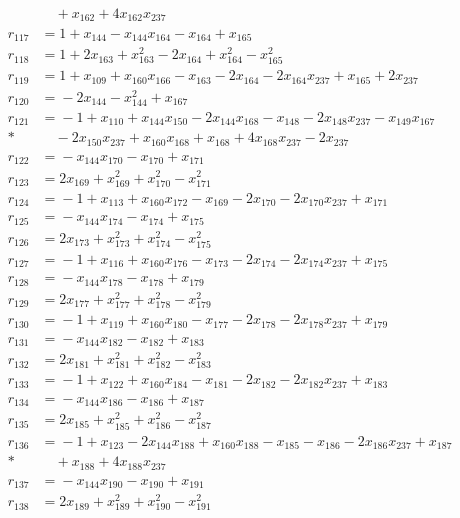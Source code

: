 \documentclass[11pt]{article}
\theoremstyle{remark}\newtheorem{remark}[theorem]{Remark}
\begin{document}
\begin{align*}
&\quad{}+x_{162}+4x_{162}x_{237}\\[2pt]
r_{117}&={}1+x_{144}-x_{144}x_{164}-x_{164}+x_{165}\\[2pt]
r_{118}&={}1+2x_{163}+x_{163}^{2}-2x_{164}+x_{164}^{2}-x_{165}^{2}\\[2pt]
r_{119}&={}1+x_{109}+x_{160}x_{166}-x_{163}-2x_{164}-2x_{164}x_{237}+x_{165}+2x_{237}\\[2pt]
r_{120}&={}-2x_{144}-x_{144}^{2}+x_{167}\\[2pt]
r_{121}&={}-1+x_{110}+x_{144}x_{150}-2x_{144}x_{168}-x_{148}-2x_{148}x_{237}-x_{149}x_{167}\\*
&\quad{}-2x_{150}x_{237}+x_{160}x_{168}+x_{168}+4x_{168}x_{237}-2x_{237}\\[2pt]
r_{122}&={}-x_{144}x_{170}-x_{170}+x_{171}\\[2pt]
r_{123}&={}2x_{169}+x_{169}^{2}+x_{170}^{2}-x_{171}^{2}\\[2pt]
r_{124}&={}-1+x_{113}+x_{160}x_{172}-x_{169}-2x_{170}-2x_{170}x_{237}+x_{171}\\[2pt]
r_{125}&={}-x_{144}x_{174}-x_{174}+x_{175}\\[2pt]
r_{126}&={}2x_{173}+x_{173}^{2}+x_{174}^{2}-x_{175}^{2}\\[2pt]
r_{127}&={}-1+x_{116}+x_{160}x_{176}-x_{173}-2x_{174}-2x_{174}x_{237}+x_{175}\\[2pt]
r_{128}&={}-x_{144}x_{178}-x_{178}+x_{179}\\[2pt]
r_{129}&={}2x_{177}+x_{177}^{2}+x_{178}^{2}-x_{179}^{2}\\[2pt]
r_{130}&={}-1+x_{119}+x_{160}x_{180}-x_{177}-2x_{178}-2x_{178}x_{237}+x_{179}\\[2pt]
r_{131}&={}-x_{144}x_{182}-x_{182}+x_{183}\\[2pt]
r_{132}&={}2x_{181}+x_{181}^{2}+x_{182}^{2}-x_{183}^{2}\\[2pt]
r_{133}&={}-1+x_{122}+x_{160}x_{184}-x_{181}-2x_{182}-2x_{182}x_{237}+x_{183}\\[2pt]
r_{134}&={}-x_{144}x_{186}-x_{186}+x_{187}\\[2pt]
r_{135}&={}2x_{185}+x_{185}^{2}+x_{186}^{2}-x_{187}^{2}\\[2pt]
r_{136}&={}-1+x_{123}-2x_{144}x_{188}+x_{160}x_{188}-x_{185}-x_{186}-2x_{186}x_{237}+x_{187}\\*
&\quad{}+x_{188}+4x_{188}x_{237}\\[2pt]
r_{137}&={}-x_{144}x_{190}-x_{190}+x_{191}\\[2pt]
r_{138}&={}2x_{189}+x_{189}^{2}+x_{190}^{2}-x_{191}^{2}\\[2pt]

\end{align*}
\end{document}
